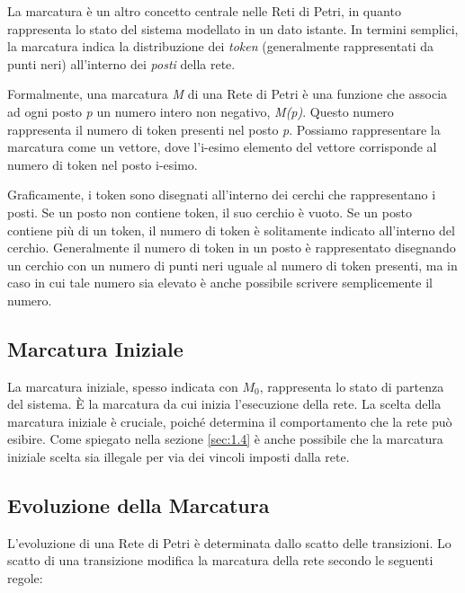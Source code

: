 La marcatura è un altro concetto centrale nelle Reti di Petri, in quanto rappresenta lo stato del sistema modellato in un dato istante. In termini semplici, la marcatura indica la distribuzione dei \textit{token} (generalmente rappresentati da punti neri) all'interno dei \textit{posti} della rete.

Formalmente, una marcatura \textit{M} di una Rete di Petri è una funzione che associa ad ogni posto \textit{p} un numero intero non negativo, \textit{M(p)}. Questo numero rappresenta il numero di token presenti nel posto \textit{p}. Possiamo rappresentare la marcatura come un vettore, dove l'i-esimo elemento del vettore corrisponde al numero di token nel posto i-esimo.

Graficamente, i token sono disegnati all'interno dei cerchi che rappresentano i posti. Se un posto non contiene token, il suo cerchio è vuoto. Se un posto contiene più di un token, il numero di token è solitamente indicato all'interno del cerchio. Generalmente il numero di token in un posto è rappresentato disegnando un cerchio con un numero di punti neri uguale al numero di token presenti, ma in caso in cui tale numero sia elevato è anche possibile scrivere semplicemente il numero.

\subsection{Marcatura Iniziale}
La marcatura iniziale, spesso indicata con $M_{0}$, rappresenta lo stato di partenza del sistema. È la marcatura da cui inizia l'esecuzione della rete. La scelta della marcatura iniziale è cruciale, poiché determina il comportamento che la rete può esibire. Come spiegato nella sezione \ref{sec:1.4} è anche possibile che la marcatura iniziale scelta sia illegale per via dei vincoli imposti dalla rete.

\subsection{Evoluzione della Marcatura}
L'evoluzione di una Rete di Petri è determinata dallo scatto delle transizioni. Lo scatto di una transizione modifica la marcatura della rete secondo le seguenti regole:

